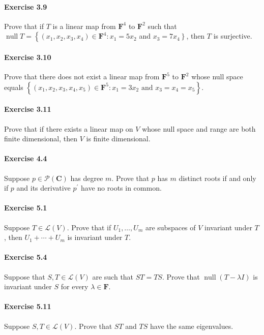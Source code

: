 \documentclass{article}
\theoremstyle{definition}
\begin{document}
\paragraph{Exercise 3.9} Prove that if $T$ is a linear map from $\mathbf{F}^{4}$ to $\mathbf{F}^{2}$ such that $\operatorname{null} T=\left\{\left(x_{1}, x_{2}, x_{3}, x_{4}\right) \in \mathbf{F}^{4}: x_{1}=5 x_{2}\right.$ and $\left.x_{3}=7 x_{4}\right\}$, then $T$ is surjective.

\paragraph{Exercise 3.10} Prove that there does not exist a linear map from $\mathbf{F}^{5}$ to $\mathbf{F}^{2}$ whose null space equals $\left\{\left(x_{1}, x_{2}, x_{3}, x_{4}, x_{5}\right) \in \mathbf{F}^{5}: x_{1}=3 x_{2} \text { and } x_{3}=x_{4}=x_{5}\right\} .$

\paragraph{Exercise 3.11} Prove that if there exists a linear map on $V$ whose null space and range are both finite dimensional, then $V$ is finite dimensional.

\paragraph{Exercise 4.4} Suppose $p \in \mathcal{P}(\mathbf{C})$ has degree $m$. Prove that $p$ has $m$ distinct roots if and only if $p$ and its derivative $p^{\prime}$ have no roots in common.

\paragraph{Exercise 5.1} Suppose $T \in \mathcal{L}(V)$. Prove that if $U_{1}, \ldots, U_{m}$ are subspaces of $V$ invariant under $T$, then $U_{1}+\cdots+U_{m}$ is invariant under $T$.

\paragraph{Exercise 5.4} Suppose that $S, T \in \mathcal{L}(V)$ are such that $S T=T S$. Prove that $\operatorname{null} (T-\lambda I)$ is invariant under $S$ for every $\lambda \in \mathbf{F}$.

\paragraph{Exercise 5.11} Suppose $S, T \in \mathcal{L}(V)$. Prove that $S T$ and $T S$ have the same eigenvalues.
\end{document}
